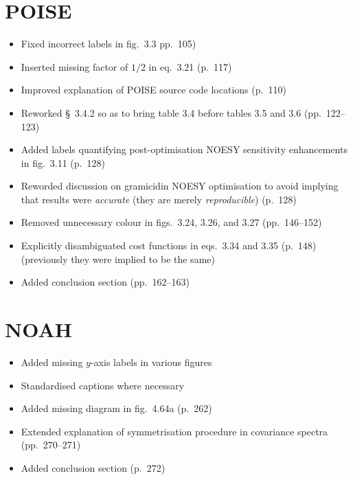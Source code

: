 \documentclass[12pt]{article}
\begin{document}
\section{POISE}

\begin{itemize}
    \item Fixed incorrect labels in fig.~3.3 pp.~105)
    \item Inserted missing factor of $1/2$ in eq.~3.21 (p.~117)
    \item Improved explanation of POISE source code locations (p.~110)
    \item Reworked \S~3.4.2 so as to bring table 3.4 before tables 3.5 and 3.6 (pp.~122--123)
    \item Added labels quantifying post-optimisation NOESY sensitivity enhancements in fig.~3.11 (p.~128)
    \item Reworded discussion on gramicidin NOESY optimisation to avoid implying that results were \textit{accurate} (they are merely \textit{reproducible}) (p.~128)
    \item Removed unnecessary colour in figs.~3.24, 3.26, and 3.27 (pp.~146--152)
    \item Explicitly disambiguated cost functions in eqs.~3.34 and 3.35 (p.~148) (previously they were implied to be the same)
    \item Added conclusion section (pp.~162--163)
\end{itemize}

\section{NOAH}

\begin{itemize}
    \item Added missing $y$-axis labels in various figures
    \item Standardised captions where necessary
    \item Added missing diagram in fig.~4.64a (p.~262)
    \item Extended explanation of symmetrisation procedure in covariance spectra (pp.~270--271)
    \item Added conclusion section (p.~272)
\end{itemize}
\end{document}
